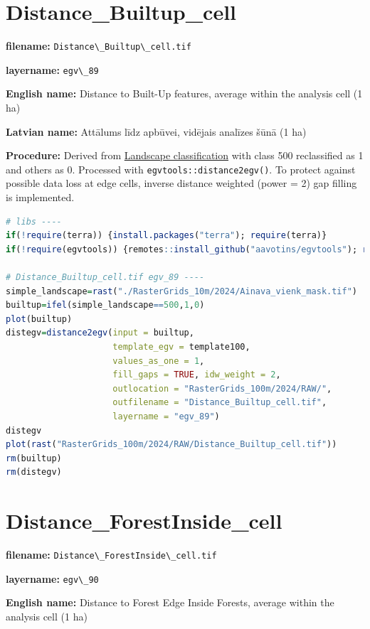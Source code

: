 \documentclass[
]{book}
\newcommand{\passthrough}[1]{#1}
\begin{document}
\section{Distance\_Builtup\_cell}\label{ch06.089}

\textbf{filename:} \passthrough{\lstinline!Distance\_Builtup\_cell.tif!}

\textbf{layername:} \passthrough{\lstinline!egv\_89!}

\textbf{English name:} Distance to Built-Up features, average within the analysis cell (1 ha)

\textbf{Latvian name:} Attālums līdz apbūvei, vidējais analīzes šūnā (1 ha)

\textbf{Procedure:} Derived from \hyperref[Ch05.03]{Landscape classification} with class 500
reclassified as 1 and others as 0. Processed with \passthrough{\lstinline!egvtools::distance2egv()!}.
To protect against possible data loss at edge cells, inverse distance
weighted (power = 2) gap filling is implemented.

\begin{lstlisting}[language=R]
# libs ----
if(!require(terra)) {install.packages("terra"); require(terra)}
if(!require(egvtools)) {remotes::install_github("aavotins/egvtools"); require(egvtools)}

# Distance_Builtup_cell.tif egv_89 ----
simple_landscape=rast("./RasterGrids_10m/2024/Ainava_vienk_mask.tif")
builtup=ifel(simple_landscape==500,1,0)
plot(builtup)
distegv=distance2egv(input = builtup,
                     template_egv = template100,
                     values_as_one = 1,
                     fill_gaps = TRUE, idw_weight = 2,
                     outlocation = "RasterGrids_100m/2024/RAW/",
                     outfilename = "Distance_Builtup_cell.tif",
                     layername = "egv_89")
distegv
plot(rast("RasterGrids_100m/2024/RAW/Distance_Builtup_cell.tif"))
rm(builtup)
rm(distegv)
\end{lstlisting}

\section{Distance\_ForestInside\_cell}\label{ch06.090}

\textbf{filename:} \passthrough{\lstinline!Distance\_ForestInside\_cell.tif!}

\textbf{layername:} \passthrough{\lstinline!egv\_90!}

\textbf{English name:} Distance to Forest Edge Inside Forests, average within the analysis cell (1 ha)
\end{document}

